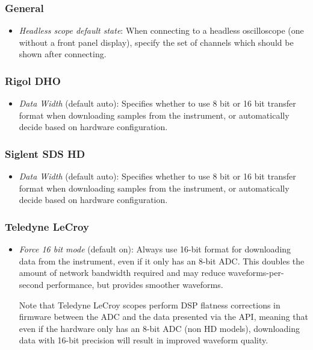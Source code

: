 \subsubsection{General}

\begin{itemize}
\item \emph{Headless scope default state}: When connecting to a headless oscilloscope (one without a front panel
display), specify the set of channels which should be shown after connecting.
\end{itemize}

\subsubsection{Rigol DHO}

\begin{itemize}
\item \emph{Data Width} (default auto): Specifies whether to use 8 bit or 16 bit transfer format when downloading samples
from the instrument, or automatically decide based on hardware configuration.
\end{itemize}

\subsubsection{Siglent SDS HD}

\begin{itemize}
\item \emph{Data Width} (default auto): Specifies whether to use 8 bit or 16 bit transfer format when downloading samples
from the instrument, or automatically decide based on hardware configuration.
\end{itemize}

\subsubsection{Teledyne LeCroy}

\begin{itemize}
\item \emph{Force 16 bit mode} (default on): Always use 16-bit format for downloading data from the instrument, even if
it only has an 8-bit ADC. This doubles the amount of network bandwidth required and may reduce waveforms-per-second
performance, but provides smoother waveforms.

Note that Teledyne LeCroy scopes perform DSP flatness corrections in firmware between the ADC and the data presented
via the API, meaning that even if the hardware only has an 8-bit ADC (non HD models), downloading data with 16-bit
precision will result in improved waveform quality.

\end{itemize}

